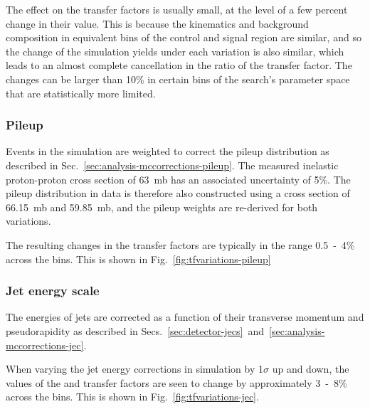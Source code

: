 The effect on the transfer factors is usually small, at the level of a few 
percent change in their value. This is because the kinematics and background 
composition in equivalent bins of the control and signal region are similar, 
and so the change of the simulation yields under each variation is also 
similar, which leads to an almost complete cancellation in the ratio of the 
transfer factor. The changes can be larger than 10\% in certain bins of the 
search's parameter space that are statistically more limited.


\subsubsection{Pileup}
Events in the simulation are weighted to correct the pileup distribution as 
described in Sec.~\ref{sec:analysis-mccorrections-pileup}. The measured 
inelastic proton-proton cross section of 63~mb has an associated uncertainty of 
5\%. The pileup distribution in data is therefore also constructed using a 
cross section of 66.15~mb and 59.85~mb, and the pileup weights are re-derived 
for both variations.

The resulting changes in the transfer factors are typically in the range 
0.5~-~4\% across the \njnbht bins. This is shown in 
Fig.~\ref{fig:tfvariations-pileup}

\subsubsection{Jet energy scale}
The energies of jets are corrected as a function of their transverse momentum 
and pseudorapidity as described in 
Secs.~\ref{sec:detector-jecs}~and~\ref{sec:analysis-mccorrections-jec}. 

When varying the jet energy corrections in simulation by 1$\sigma$ up and down, 
the values of the \Tmutottw and \Tmumutoz transfer factors are seen to change 
by approximately 3~-~8\% across the \njnbht bins.
This is shown in Fig.~\ref{fig:tfvariations-jec}.


